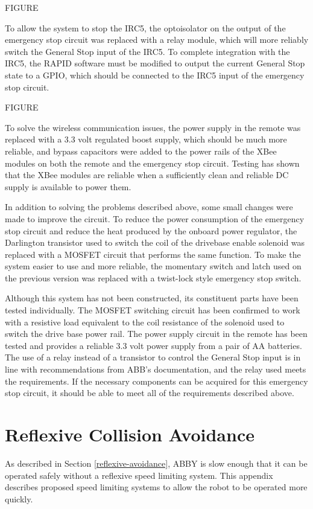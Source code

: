 \documentclass[]{cwru} %
\begin{document}
FIGURE

To allow the system to stop the IRC5, the optoisolator on the output of
the emergency stop circuit was replaced with a relay module, which will
more reliably switch the General Stop input of the IRC5. To complete
integration with the IRC5, the RAPID software must be modified to output
the current General Stop state to a GPIO, which should be connected to
the IRC5 input of the emergency stop circuit.

FIGURE

To solve the wireless communication issues, the power supply in the
remote was replaced with a 3.3 volt regulated boost supply, which should
be much more reliable, and bypass capacitors were added to the power
rails of the XBee modules on both the remote and the emergency stop
circuit. Testing has shown that the XBee modules are reliable when a
sufficiently clean and reliable DC supply is available to power them.

In addition to solving the problems described above, some small changes
were made to improve the circuit. To reduce the power consumption of the
emergency stop circuit and reduce the heat produced by the onboard power
regulator, the Darlington transistor used to switch the coil of the
drivebase enable solenoid was replaced with a MOSFET circuit that
performs the same function. To make the system easier to use and more
reliable, the momentary switch and latch used on the previous version
was replaced with a twist-lock style emergency stop switch.

Although this system has not been constructed, its constituent parts
have been tested individually. The MOSFET switching circuit has been
confirmed to work with a resistive load equivalent to the coil
resistance of the solenoid used to switch the drive base power rail. The
power supply circuit in the remote has been tested and provides a
reliable 3.3 volt power supply from a pair of AA batteries. The use of a
relay instead of a transistor to control the General Stop input is in
line with recommendations from ABB's documentation, and the relay used
meets the requirements. If the necessary components can be acquired for
this emergency stop circuit, it should be able to meet all of the
requirements described above.

\chapter{Reflexive Collision Avoidance}

As described in Section \ref{reflexive-avoidance}, ABBY is slow enough that it can be operated
safely without a reflexive speed limiting system. This appendix
describes proposed speed limiting systems to allow the robot to be
operated more quickly.
\end{document}
